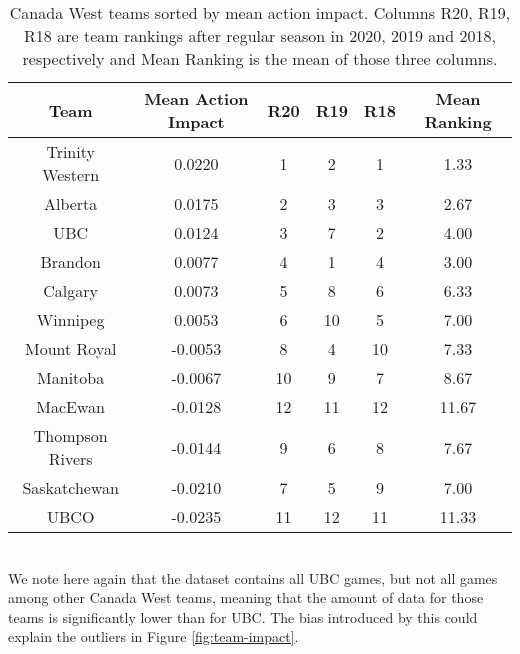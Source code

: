 \documentclass{sfuthesis}
\begin{document}
	\begin{table}[ht]
		\centering
		\begin{tabular}{cccccc}
			\textbf{Team}   & \textbf{Mean Action Impact} & \textbf{R20} & \textbf{R19} & \textbf{R18} & \textbf{Mean Ranking} \\ \hline
			Trinity Western & 0.0220                      & 1            & 2            & 1            & 1.33                  \\
			Alberta         & 0.0175                      & 2            & 3            & 3            & 2.67                  \\
			UBC             & 0.0124                      & 3            & 7            & 2            & 4.00                  \\
			Brandon         & 0.0077                      & 4            & 1            & 4            & 3.00                  \\
			Calgary         & 0.0073                      & 5            & 8            & 6            & 6.33                  \\
			Winnipeg        & 0.0053                      & 6            & 10           & 5            & 7.00                  \\
			Mount Royal     & -0.0053                     & 8            & 4            & 10           & 7.33                  \\
			Manitoba        & -0.0067                     & 10           & 9            & 7            & 8.67                  \\
			MacEwan         & -0.0128                     & 12           & 11           & 12           & 11.67                 \\
			Thompson Rivers & -0.0144                     & 9            & 6            & 8            & 7.67                  \\
			Saskatchewan    & -0.0210                     & 7            & 5            & 9            & 7.00                  \\
			UBCO            & -0.0235                     & 11           & 12           & 11           & 11.33                
		\end{tabular}
		\caption{Canada West teams sorted by mean action impact. Columns R20, R19, R18 are team rankings after regular season in 2020, 2019 and 2018, respectively and Mean Ranking is the mean of those three columns.}
		\label{tab:team-impact}
	\end{table}\\
	We note here again that the dataset contains all UBC games, but not all games among other Canada West teams, meaning that the amount of data for those teams is significantly lower than for UBC. The bias introduced by this could explain the outliers in Figure \ref{fig:team-impact}.\\\\
\end{document}
